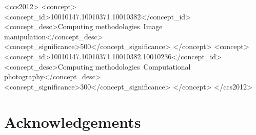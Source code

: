 \documentclass[review]{acmsiggraph}
\begin{document}

%
%
\begin{CCSXML}
<ccs2012>
<concept>
<concept_id>10010147.10010371.10010382</concept_id>
<concept_desc>Computing methodologies~Image manipulation</concept_desc>
<concept_significance>500</concept_significance>
</concept>
<concept>
<concept_id>10010147.10010371.10010382.10010236</concept_id>
<concept_desc>Computing methodologies~Computational photography</concept_desc>
<concept_significance>300</concept_significance>
</concept>
</ccs2012>
\end{CCSXML}


%
%


\keywordlist

\conceptlist

\printcopyright








\section*{Acknowledgements}


\nocite{*}

\end{document}
